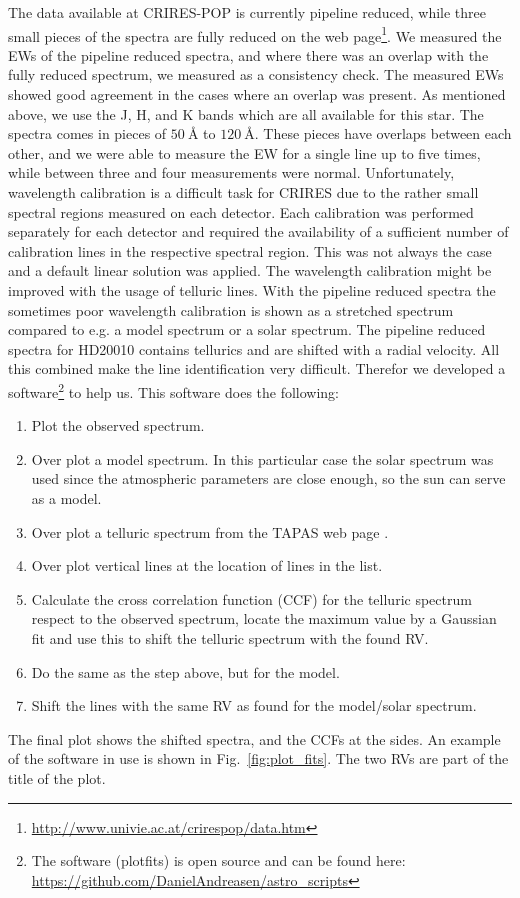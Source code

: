 \documentclass{aa}
\begin{document}
The data available at CRIRES-POP is currently pipeline reduced, while
three small pieces of the spectra are fully reduced on
the web page\footnote{\url{http://www.univie.ac.at/crirespop/data.htm}}.
We measured the EWs of the pipeline reduced spectra, and where there
was an overlap with the fully reduced spectrum, we measured as a
consistency check. The measured EWs showed good agreement in the cases
where an overlap was present. As mentioned above, we use the J, H,
and K bands which are all available for this star. The spectra comes
in pieces of $\SI{50}{\angstrom}$ to $\SI{120}{\angstrom}$. These
pieces have overlaps between each other, and we were able
to measure the EW for a single line up to five times, while between
three and four measurements were normal. Unfortunately, wavelength
calibration is a difficult task for CRIRES due to the rather small
spectral regions measured on each detector. Each calibration was
performed separately for each detector and required the availability
of a sufficient number of calibration lines in the respective spectral
region. This was not always the case and a default linear solution
was applied. The wavelength calibration might be improved with the
usage of telluric lines. With the pipeline reduced spectra the
sometimes poor wavelength calibration is shown as a stretched spectrum
compared to e.g. a model spectrum or a solar spectrum. The pipeline
reduced spectra for HD20010 contains tellurics and are shifted with a
radial velocity. All this combined make the line identification very
difficult. Therefor we developed a software\footnote{The software
(plot\textunderscore{}fits) is open source and can be found here:
\url{https://github.com/DanielAndreasen/astro_scripts}} to help us. This
software does the following:
\begin{enumerate}
    \item Plot the observed spectrum.
    \item Over plot a model spectrum. In this particular case the solar spectrum was
        used since the atmospheric parameters are close enough, so the sun can
        serve as a model.
    \item Over plot a telluric spectrum from the TAPAS web page \citep{Bertaux2014}.
    \item Over plot vertical lines at the location of lines in the list.
    \item Calculate the cross correlation function (CCF) for the telluric spectrum
        respect to the observed spectrum, locate the maximum value by a Gaussian fit
        and use this to shift the telluric spectrum with the found RV.
    \item Do the same as the step above, but for the model.
    \item Shift the lines with the same RV as found for the model/solar spectrum.
\end{enumerate}
The final plot shows the shifted spectra, and the CCFs at the sides. An
example of the software in use is shown in Fig.~\ref{fig:plot_fits}. The
two RVs are part of the title of the plot.
\end{document}
